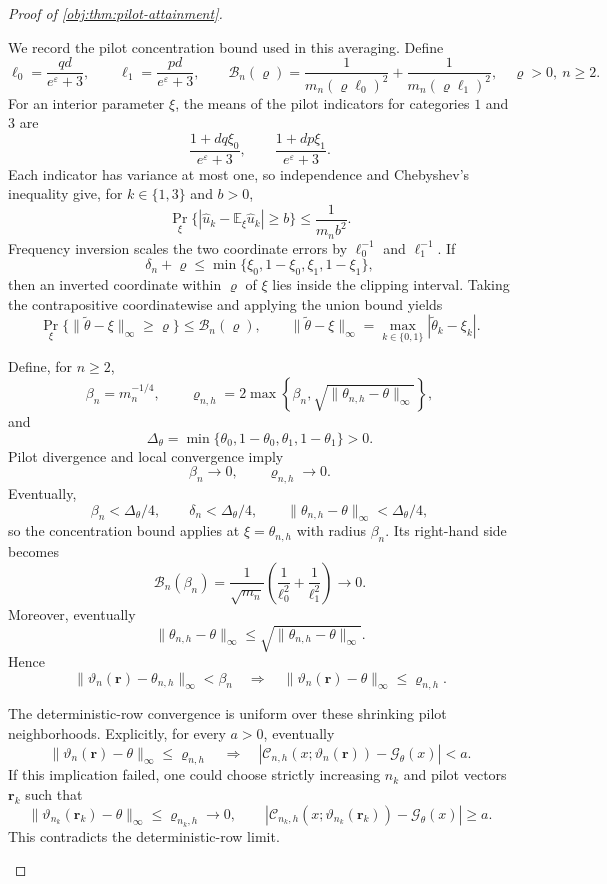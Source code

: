 \documentclass[11pt]{article}
\begin{document}
\begin{proof}[Proof of \cref{obj:thm:pilot-attainment}]
\begin{enumerate}
We record the pilot concentration bound used in this averaging. Define
\[
\ell_0=\frac{qd}{e^\varepsilon+3},
\qquad
\ell_1=\frac{pd}{e^\varepsilon+3},
\qquad
\mathcal B_n(\varrho)
=
\frac1{m_n(\varrho\ell_0)^2}
+\frac1{m_n(\varrho\ell_1)^2},
\quad \varrho>0,\ n\ge2.
\]
For an interior parameter \(\xi\), the means of the pilot indicators for categories \(1\) and \(3\) are
\[
\frac{1+dq\xi_0}{e^\varepsilon+3},
\qquad
\frac{1+dp\xi_1}{e^\varepsilon+3}.
\]
Each indicator has variance at most one, so independence and Chebyshev's inequality give, for \(k\in\{1,3\}\) and \(b>0\),
\[
\Pr_\xi\{|\widehat u_k-\mathbb E_\xi\widehat u_k|\ge b\}
\le\frac1{m_nb^2}.
\]
Frequency inversion scales the two coordinate errors by
\(\ell_0^{-1}\) and \(\ell_1^{-1}\). If
\[
\delta_n+\varrho\le
\min\{\xi_0,1-\xi_0,\xi_1,1-\xi_1\},
\]
then an inverted coordinate within \(\varrho\) of \(\xi\) lies inside the clipping interval. Taking the contrapositive coordinatewise and applying the union bound yields
\[
\Pr_\xi\{\|\widetilde\theta-\xi\|_\infty\ge\varrho\}
\le\mathcal B_n(\varrho),
\qquad
\|\widetilde\theta-\xi\|_\infty
=\max_{k\in\{0,1\}}|\widetilde\theta_k-\xi_k|.
\]

Define, for \(n\ge2\),
\[
\beta_n=m_n^{-1/4},
\qquad
\varrho_{n,h}
=
2\max\left\{
\beta_n,\sqrt{\|\theta_{n,h}-\theta\|_\infty}
\right\},
\]
and
\[
\Delta_\theta
=\min\{\theta_0,1-\theta_0,\theta_1,1-\theta_1\}>0.
\]
Pilot divergence and local convergence imply
\[
\beta_n\to0,\qquad \varrho_{n,h}\to0.
\]
Eventually,
\[
\beta_n<\Delta_\theta/4,\qquad
\delta_n<\Delta_\theta/4,\qquad
\|\theta_{n,h}-\theta\|_\infty<\Delta_\theta/4,
\]
so the concentration bound applies at \(\xi=\theta_{n,h}\) with radius \(\beta_n\). Its right-hand side becomes
\[
\mathcal B_n(\beta_n)
=
\frac1{\sqrt{m_n}}
\left(\frac1{\ell_0^2}+\frac1{\ell_1^2}\right)
\longrightarrow0.
\]
Moreover, eventually
\[
\|\theta_{n,h}-\theta\|_\infty
\le\sqrt{\|\theta_{n,h}-\theta\|_\infty}.
\]
Hence
\[
\|\vartheta_n(\mathbf r)-\theta_{n,h}\|_\infty<\beta_n
\quad\Longrightarrow\quad
\|\vartheta_n(\mathbf r)-\theta\|_\infty\le\varrho_{n,h}.
\]

The deterministic-row convergence is uniform over these shrinking pilot neighborhoods. Explicitly, for every \(a>0\), eventually
\[
\|\vartheta_n(\mathbf r)-\theta\|_\infty\le\varrho_{n,h}
\quad\Longrightarrow\quad
|\mathcal C_{n,h}(x;\vartheta_n(\mathbf r))
-\mathcal G_\theta(x)|<a.
\]
If this implication failed, one could choose strictly increasing \(n_k\) and pilot vectors \(\mathbf r_k\) such that
\[
\|\vartheta_{n_k}(\mathbf r_k)-\theta\|_\infty
\le\varrho_{n_k,h}\longrightarrow0,
\qquad
|\mathcal C_{n_k,h}(x;\vartheta_{n_k}(\mathbf r_k))
-\mathcal G_\theta(x)|\ge a.
\]
This contradicts the deterministic-row limit.


\end{enumerate}
\end{proof}
\end{document}

